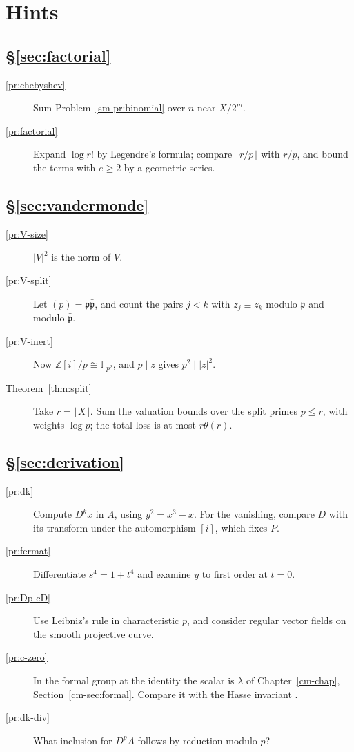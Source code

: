 \documentclass[reqno]{amsart}
\newcounter{chap}
\theoremstyle{definition}
\theoremstyle{plain}
\newcommand{\F}{\mathbb{F}}
\newcommand{\Z}{\mathbb{Z}}
\newcommand{\Zi}{\Z[i]}
\begin{document}
\section*{Hints}

\subsection*{\S\ref{sec:factorial}}
\begin{description}
\item[\ref{pr:chebyshev}] Sum Problem~\ref{sm-pr:binomial} over \(n\) near \(X/2^m\).
\item[\ref{pr:factorial}] Expand \(\log r!\) by Legendre's formula; compare \(\lfloor r/p \rfloor\) with \(r/p\), and bound the terms with \(e \ge 2\) by a geometric series.
\end{description}

\subsection*{\S\ref{sec:vandermonde}}
\begin{description}
\item[\ref{pr:V-size}] \(\lvert V \rvert^2\) is the norm of \(V\).
\item[\ref{pr:V-split}] Let \((p) = \mathfrak p\bar{\mathfrak p}\), and count the pairs \(j < k\) with \(z_j \equiv z_k\) modulo \(\mathfrak p\) and modulo \(\bar{\mathfrak p}\).
\item[\ref{pr:V-inert}] Now \(\Zi/p \cong \F_{p^2}\), and \(p \mid z\) gives \(p^2 \mid \lvert z \rvert^2\).
\item[Theorem~\ref{thm:split}] Take \(r = \lfloor X \rfloor\).  Sum the valuation bounds over the split primes \(p \le r\), with weights \(\log p\); the total loss is at most \(r\theta(r)\).
\end{description}

\subsection*{\S\ref{sec:derivation}}
\begin{description}
\item[\ref{pr:dk}] Compute \(D^k x\) in \(A\), using \(y^2 = x^3 - x\).  For the vanishing, compare \(D\) with its transform under the automorphism \([i]\), which fixes \(P\).
\item[\ref{pr:fermat}] Differentiate \(s^4 = 1 + t^4\) and examine \(y\) to first order at \(t = 0\).
\item[\ref{pr:Dp-cD}] Use Leibniz's rule in characteristic \(p\), and consider regular vector fields on the smooth projective curve.
\item[\ref{pr:c-zero}] In the formal group at the identity the scalar is \(\lambda\) of Chapter~\ref{cm-chap}, Section~\ref{cm-sec:formal}.  Compare it with the Hasse invariant \cite[Thm.~V.4.1(a)]{Si1}.
\item[\ref{pr:dk-div}] What inclusion for \(D^p A\) follows by reduction modulo \(p\)?
\end{description}
\end{document}
